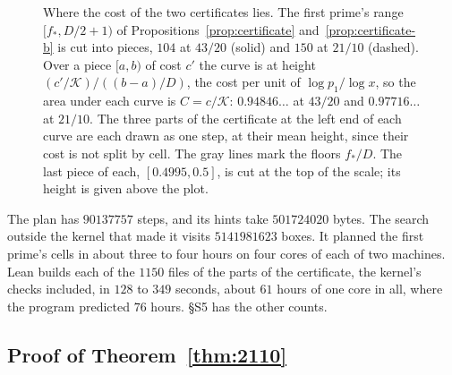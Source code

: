 \documentclass[11pt]{article}
\theoremstyle{definition}
\begin{document}
\begin{figure}[t]
\centering

\caption{Where the cost of the two certificates lies. The first prime's range $[f_*, D/2 + 1)$ of
Propositions~\ref{prop:certificate} and~\ref{prop:certificate-b} is cut into pieces, $104$ at $43/20$ (solid) and
$150$ at $21/10$ (dashed). Over a piece $[a, b)$ of cost $c'$ the curve is at height $(c'/\mathcal K)/((b - a)/D)$,
the cost per unit of $\log p_1/\log x$, so the area under each curve is $C = c/\mathcal K$: $0.94846\ldots$ at $43/20$
and $0.97716\ldots$ at $21/10$. The three parts of the certificate at the left end of each curve are each drawn as one
step, at their mean height, since their cost is not split by cell. The gray
lines mark the floors $f_*/D$. The last piece of each, $[0.4995, 0.5]$, is cut at the top of the scale; its height is
given above the plot.}
\label{fig:cost}
\end{figure}

The plan has $90137757$ steps, and its hints take $501724020$ bytes. The search outside the kernel that made it visits
$5141981623$ boxes. It planned the first prime's cells in about three to four hours on four cores of each of two
machines. Lean builds each of the $1150$ files of the parts of the certificate, the kernel's checks included, in $128$
to $349$ seconds, about $61$ hours of one core in all, where the program predicted $76$ hours. \S S5 has the other
counts.

\subsection{Proof of Theorem~\ref{thm:2110}}
\end{document}
